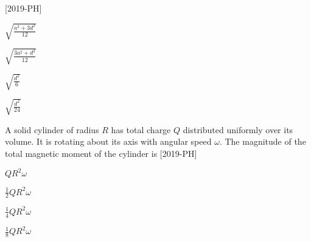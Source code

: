     \hfill{[2019-PH]}\\
\begin{enumerate}
\begin{multicols}{4}
\item $\sqrt{\frac{a^2 + 3d^2}{12}}$
\item $\sqrt{\frac{3a^2 + d^2}{12}}$
\item $\sqrt{\frac{d^2}{6}}$
\item $\sqrt{\frac{d^2}{24}}$
\end{multicols}
\end{enumerate}
\item A solid cylinder of radius $R$ has total charge $Q$ distributed uniformly over its volume. It is rotating about its axis with angular speed $\omega$. The magnitude of the total magnetic moment of the cylinder is \hfill{[2019-PH]}\\
\begin{enumerate}
\begin{multicols}{2}
\item $QR^2 \omega$
\item $\frac{1}{2}QR^2 \omega$
\item $\frac{1}{4}QR^2 \omega$
\item $\frac{1}{8}QR^2 \omega$
\end{multicols}
\end{enumerate}
